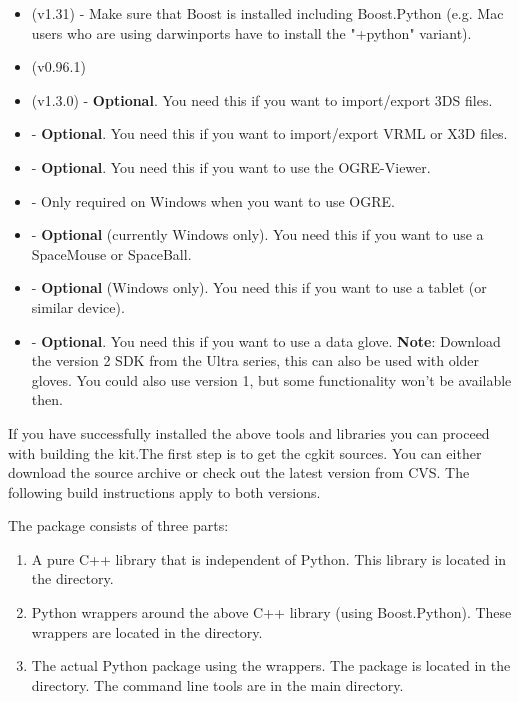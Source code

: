 \begin{itemize}
\item {} (v1.31) - Make sure that Boost is
 installed including Boost.Python (e.g. Mac users who are using darwinports
 have to install the "+python" variant).
\item {} (v0.96.1)
\item {} (v1.3.0) - {\bf Optional}. You need this if you want to import/export 3DS files.
\item {} - {\bf Optional}. You need this if you want to import/export VRML or X3D files.
\item {} - {\bf Optional}. You need this if you want to use the OGRE-Viewer.
\item {} - Only required on Windows when
 you want to use OGRE.
\item {} - {\bf Optional} (currently Windows only). You need this if you want to use a SpaceMouse or SpaceBall.
\item {} - {\bf Optional} (Windows only). You need this if you want to use a tablet (or similar device).
\item {} - {\bf Optional}. You need this if you want to use a data glove. {\bf Note}: Download the version 2 SDK from the Ultra series, this can also be used with older gloves. You could also use version 1, but some functionality won't be available then.
\end{itemize}

If you have successfully installed the above tools and libraries you
can proceed with building the kit.The first step is to get the cgkit
sources. You can either download the source archive or check out the
latest version from CVS. The following build instructions apply to
both versions.

The package consists of three parts:

\begin{enumerate}
\item A pure C++ library that is independent of Python. This library is
 located in the  directory.
\item Python wrappers around the above C++ library (using Boost.Python). 
 These wrappers are located in the  directory.
\item The actual Python package using the wrappers. The package is located
 in the  directory. The command line tools are in the main 
 directory.
\end{enumerate}

